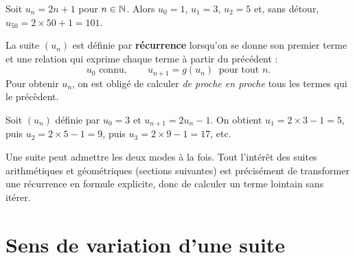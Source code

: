\begin{exemple}
Soit $u_n = 2n+1$ pour $n\in\mathbb{N}$. Alors $u_0=1$, $u_1=3$, $u_2=5$ et, sans détour,
$u_{50}=2\times 50+1=101$.
\end{exemple}

\begin{definition}
La suite $(u_n)$ est définie par \textbf{récurrence} lorsqu'on se donne son premier terme
et une relation qui exprime chaque terme à partir du précédent :
\[ u_{0} \text{ connu},\qquad u_{n+1}=g(u_n)\ \text{ pour tout } n. \]
Pour obtenir $u_n$, on est obligé de calculer \emph{de proche en proche} tous les termes
qui le précèdent.
\end{definition}

\begin{exemple}
Soit $(u_n)$ définie par $u_0=3$ et $u_{n+1}=2u_n-1$. On obtient
$u_1=2\times 3-1=5$, puis $u_2=2\times 5-1=9$, puis $u_3=2\times 9-1=17$, etc.
\end{exemple}

\begin{remarque}
Une suite peut admettre les deux modes à la fois. Tout l'intérêt des suites
arithmétiques et géométriques (sections suivantes) est précisément de transformer une
récurrence en formule explicite, donc de calculer un terme lointain sans itérer.
\end{remarque}

\begin{illus}
\end{illus}

\section{Sens de variation d'une suite}

